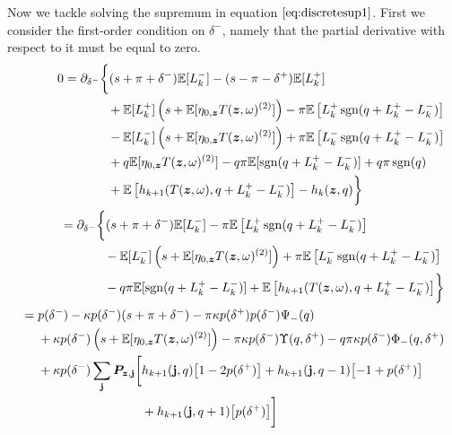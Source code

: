 Now we tackle solving the supremum in equation $\ref{eq:discretesup1}$. First we consider the first-order condition on $\delta^-$, namely that the partial derivative with respect to it must be equal to zero.
\begin{align}
\begin{split}
0 & = \partial_{\delta^-} \biggl\lbrace 
(s + \pi + \delta^-)\E [L_k^-] - (s - \pi - \delta^+)\E[L_k^+] \\
& \hphantom{\partial_{\delta^-} \biggl\lbrace {}+{}} + \E[L_k^+] \left( s + \E[\eta_{0,\bz} T(\bz, \omega)^{(2)}] \right)  - \pi \E \left[L_k^+ \sgn( q + L_k^+ - L_k^-) \right] \\
& \hphantom{\partial_{\delta^-} \biggl\lbrace {}+{}} - \E[L_k^-] \left( s + \E[\eta_{0,\bz} T(\bz, \omega)^{(2)}] \right) + \pi \E \left[ L_k^- \sgn( q + L_k^+ - L_k^-) \right] \\
& \hphantom{\partial_{\delta^-} \biggl\lbrace {}+{}} + q \E[ \eta_{0,\bz} T(\bz, \omega)^{(2)}]  - q \pi \E[ \sgn( q + L_k^+ - L_k^-)] + q \pi \sgn(q)  \\
& \hphantom{\partial_{\delta^-} \biggl\lbrace {}+{}} + \E \left[ h_{k+1}(T(\bz,\omega), q + L_k^+ - L_k^- ) \right] -  h_k(\bz,q) \biggr\rbrace
\end{split} \\
\begin{split}
& = \partial_{\delta^-} \biggl\lbrace 
(s + \pi + \delta^-)\E [L_k^-] - \pi \E \left[L_k^+ \sgn( q + L_k^+ - L_k^-) \right] \\
& \hphantom{\partial_{\delta^-} \biggl\lbrace {}+{}} - \E[L_k^-] \left( s + \E[\eta_{0,\bz} T(\bz, \omega)^{(2)}] \right) + \pi \E \left[ L_k^- \sgn( q + L_k^+ - L_k^-) \right] \\
& \hphantom{\partial_{\delta^-} \biggl\lbrace {}+{}} - q \pi \E[ \sgn( q + L_k^+ - L_k^-)]  + \E \left[ h_{k+1}(T(\bz,\omega), q + L_k^+ - L_k^- ) \right]  \biggr\rbrace
\end{split} \\
\begin{split}
& = p(\delta^-) - \kappa p(\delta^-) (s + \pi + \delta^-) - \pi \kappa p(\delta^+)p(\delta^-)\Psi_-(q) \\
& \hphantom{{}={}} + \kappa p(\delta^-) \left( s + \E[\eta_{0,\bz} T(\bz, \omega)^{(2)}] \right) - \pi \kappa p(\delta^-) \Upsilon(q,\delta^+) - q \pi \kappa p(\delta^-) \Phi_-(q,\delta^+) \\
& \hphantom{{}={}} + \kappa p(\delta^-) \sum_\bj \bP_{\bz,\bj} \biggl[ h_{k+1}(\bj, q) \bigl[ 1 - 2 p(\delta^+) \bigr] + h_{k+1}(\bj, q-1) \bigl[-1 + p(\delta^+) \bigr] \\
& \hphantom{{}={} + \kappa p(\delta^-) \sum_\bj \bP_{\bz,\bj} \biggl[} + h_{k+1}(\bj, q+1) \bigl[ p(\delta^+) \bigr] \biggr]
\end{split}
\end{align}
